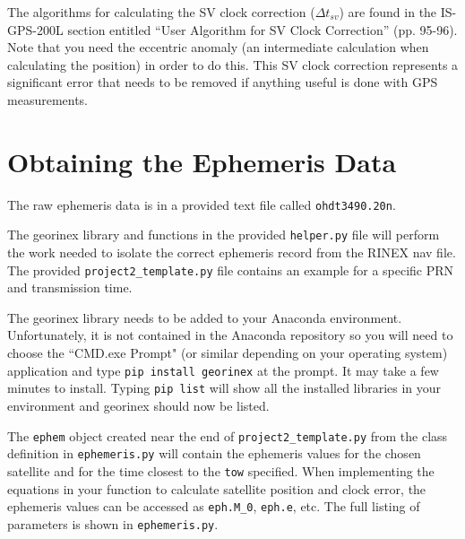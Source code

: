 \documentclass[12pt]{article}
\begin{document}
The algorithms for calculating the SV clock correction ($\Delta t_{sv}$) are
found in the IS-GPS-200L section entitled ``User Algorithm for SV Clock
Correction'' (pp. 95-96).  Note that you need the eccentric anomaly (an intermediate
calculation when calculating the position) in order to do this.  This SV clock
correction represents a significant error that needs to be removed if anything
useful is done with GPS measurements.

\section*{\textsf{Obtaining the Ephemeris Data}}

The raw ephemeris data is in a provided text file called \texttt{ohdt3490.20n}.  


The georinex library and functions in the provided \texttt{helper.py} file will perform the work needed
to isolate the correct ephemeris record from the RINEX nav file.  The provided
\texttt{project2\_template.py} file contains an example for a specific PRN and transmission time.

The georinex library needs to be added to your Anaconda environment.  Unfortunately, it is not
contained in the Anaconda repository so you will need to choose the ``CMD.exe Prompt" (or similar
depending on your operating system) application and type \texttt{pip install georinex} at the 
prompt.  It may take a few minutes to install.  Typing \texttt{pip list} will show all the installed libraries in your environment 
and georinex should now be listed.

The \texttt{ephem} object created near the end of \texttt{project2\_template.py} from the class definition 
in \texttt{ephemeris.py} will contain the ephemeris values for the chosen satellite 
and for the time closest to the \texttt{tow} specified.  When implementing the equations in your
function to calculate satellite position and clock error, the ephemeris values can be accessed as
\texttt{eph.M\_0}, \texttt{eph.e}, etc.  The full listing of parameters is shown in \texttt{ephemeris.py}.
\end{document}
